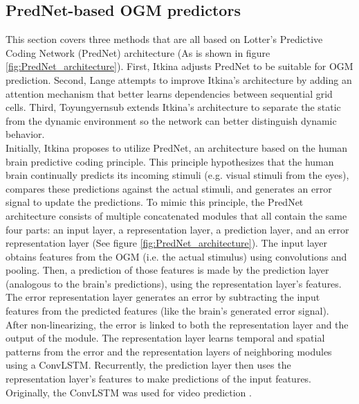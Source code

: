 \subsection{PredNet-based \gls{OGM} predictors} \label{subsec:prednet}
This section covers three methods that are all based on Lotter's \cite{lotter2016deep} Predictive Coding Network (PredNet) architecture (As is shown in figure \ref{fig:PredNet_architecture}). First, Itkina \cite{itkina2019dynamic} adjusts PredNet to be suitable for \gls{OGM} prediction. Second, Lange \cite{lange2020attention} attempts to improve Itkina's \cite{itkina2019dynamic} architecture by adding an attention mechanism that better learns dependencies between sequential grid cells. Third, Toyungyernsub \cite{toyungyernsub2020double} extends Itkina's \cite{itkina2019dynamic} architecture to separate the static from the dynamic environment so the network can better distinguish dynamic behavior.  \\

Initially, Itkina \cite{itkina2019dynamic} proposes to utilize PredNet, an architecture based on the human brain predictive coding principle. This principle hypothesizes that the human brain continually predicts its incoming stimuli (e.g. visual stimuli from the eyes), compares these predictions against the actual stimuli, and generates an error signal to update the predictions. To mimic this principle, the PredNet architecture consists of multiple concatenated modules that all contain the same four parts: an input layer, a representation layer, a prediction layer, and an error representation layer (See figure \ref{fig:PredNet_architecture}). The input layer obtains features from the \gls{OGM} (i.e. the actual stimulus) using convolutions and pooling. Then, a prediction of those features is made by the prediction layer (analogous to the brain's predictions), using the representation layer's features. The error representation layer generates an error by subtracting the input features from the predicted features (like the brain's generated error signal). After non-linearizing, the error is linked to both the representation layer and the output of the module. The representation layer learns temporal and spatial patterns from the error and the representation layers of neighboring modules using a \gls{ConvLSTM}. Recurrently, the prediction layer then uses the representation layer's features to make predictions of the input features. Originally, the \gls{ConvLSTM} was used for video prediction \cite{lotter2016deep}. \\

